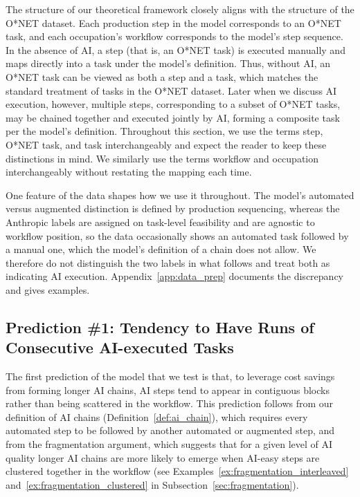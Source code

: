 The structure of our theoretical framework closely aligns with the structure of the O*NET dataset.
Each production step in the model corresponds to an O*NET task, and each occupation's workflow corresponds to the model's step sequence.
In the absence of AI, a step (that is, an O*NET task) is executed manually and maps directly into a task under the model's definition.
Thus, without AI, an O*NET task can be viewed as both a step and a task, which matches the standard treatment of tasks in the O*NET dataset.
Later when we discuss AI execution, however, multiple steps, corresponding to a subset of O*NET tasks, may be chained together and executed jointly by AI, forming a composite task per the model's definition.
Throughout this section, we use the terms step, O*NET task, and task interchangeably and expect the reader to keep these distinctions in mind.
We similarly use the terms workflow and occupation interchangeably without restating the mapping each time.

One feature of the data shapes how we use it throughout.
The model's automated versus augmented distinction is defined by production sequencing, whereas the Anthropic labels are assigned on task-level feasibility and are agnostic to workflow position, so the data occasionally shows an automated task followed by a manual one, which the model's definition of a chain does not allow.
We therefore do not distinguish the two labels in what follows and treat both as indicating AI execution.
Appendix~\ref{app:data_prep} documents the discrepancy and gives examples.


\subsection{Prediction \#1: Tendency to Have Runs of Consecutive AI-executed Tasks}
\label{sec:chainLength_prediction}

The first prediction of the model that we test is that, to leverage cost savings from forming longer AI chains, AI steps tend to appear in contiguous blocks rather than being scattered in the workflow.
This prediction follows from our definition of AI chains (Definition~\ref{def:ai_chain}), which requires every automated step to be followed by another automated or augmented step, and from the fragmentation argument, which suggests that for a given level of AI quality longer AI chains are more likely to emerge when AI-easy steps are clustered together in the workflow (see Examples~\ref{ex:fragmentation_interleaved} and~\ref{ex:fragmentation_clustered} in Subsection~\ref{sec:fragmentation}).

